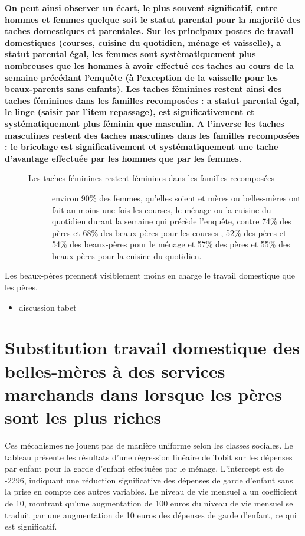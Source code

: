\documentclass[
  12pt,
]{book}
\providecommand{\tightlist}{%
  \setlength{\itemsep}{0pt}\setlength{\parskip}{0pt}}
\begin{document}
\begin{description}
\item[\textbf{On peut ainsi observer un écart, le plus souvent
significatif, entre hommes et femmes quelque soit le statut parental
pour la majorité des taches domestiques et parentales. Sur les
principaux postes de travail domestiques (courses, cuisine du quotidien,
ménage et vaisselle), a statut parental égal, les femmes sont
systèmatiquement plus nombreuses que les hommes à avoir effectué ces
taches au cours de la semaine précédant l'enquête (à l'exception de la
vaisselle pour les beaux-parents sans enfants). Les taches féminines
restent ainsi des taches féminines dans les familles recomposées : a
statut parental égal, le linge (saisir par l'item repassage), est
significativement et systématiquement plus féminin que masculin. A
l'inverse les taches masculines restent des taches masculines dans les
familles recomposées : le bricolage est significativement et
systématiquement une tache d'avantage effectuée par les hommes que par
les femmes.}]
\begin{description}
\item[Les taches féminines restent féminines dans les familles
recomposées]
environ 90\% des femmes, qu'elles soient et mères ou belles-mères ont
fait au moins une fois les courses, le ménage ou la cuisine du quotidien
durant la semaine qui précède l'enquête, contre 74\% des pères et 68\%
des beaux-pères pour les courses , 52\% des pères et 54\% des
beaux-pères pour le ménage et 57\% des pères et 55\% des beaux-pères
pour la cuisine du quotidien.
\end{description}
\end{description}

Les beaux-pères prennent visiblement moins en charge le travail
domestique que les pères.

\begin{itemize}
\tightlist
\item
  discussion tabet
\end{itemize}

\section{Substitution travail domestique des belles-mères à des services
marchands dans lorsque les pères sont les plus
riches}\label{substitution-travail-domestique-des-belles-muxe8res-uxe0-des-services-marchands-dans-lorsque-les-puxe8res-sont-les-plus-riches}

Ces mécanismes ne jouent pas de manière uniforme selon les classes
sociales. Le tableau présente les résultats d'une régression linéaire de
Tobit sur les dépenses par enfant pour la garde d'enfant effectuées par
le ménage. L'intercept est de -2296, indiquant une réduction
significative des dépenses de garde d'enfant sans la prise en compte des
autres variables. Le niveau de vie mensuel a un coefficient de 10,
montrant qu'une augmentation de 100 euros du niveau de vie mensuel se
traduit par une augmentation de 10 euros des dépenses de garde d'enfant,
ce qui est significatif.
\end{document}
